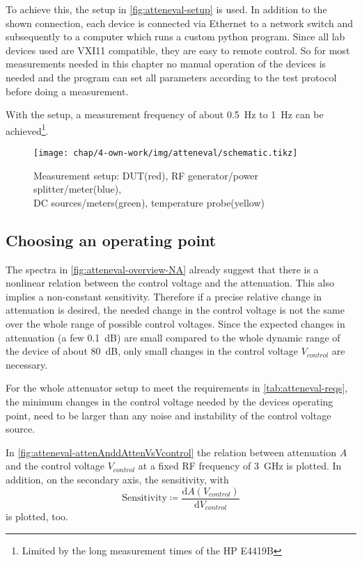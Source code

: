 To achieve this, the setup in \autoref{fig:atteneval-setup} is used. In addition to the shown connection, each device is connected via Ethernet to a network switch and subsequently to a computer which runs a custom python program. Since all lab devices used are VXI11 compatible, they are easy to remote control. So for most measurements needed in this chapter no manual operation of the devices is needed and the program can set all parameters according to the test protocol before doing a measurement.

With the setup, a measurement frequency of about \SI{0.5}{\Hz} to \SI{1}{\Hz} can be achieved\footnote{Limited by the long measurement times of the HP E4419B}.

\begin{figure}[tb]
	\centering
	\texttt{[image: chap/4-own-work/img/atteneval/schematic.tikz]}
	\caption{Measurement setup: DUT(red), RF generator/power splitter/meter(blue),\\ DC sources/meters(green), temperature probe(yellow)}
	\label{fig:atteneval-setup}
\end{figure}

\FloatBarrier
\subsection{Choosing an operating point}
The spectra in \autoref{fig:atteneval-overview-NA} already suggest that there is a nonlinear relation between the control voltage and the attenuation. This also implies a non-constant sensitivity. Therefore if a precise relative change in attenuation is desired, the needed change in the control voltage is not the same over the whole range of possible control voltages. Since the expected changes in attenuation (a few \SI{0.1}{\dB}) are small compared to the whole dynamic range of the device of about \SI{80}{\dB}, only small changes in the control voltage $V_{control}$ are necessary. 

For the whole attenuator setup to meet the requirements in \autoref{tab:atteneval-reqs}, the minimum changes in the control voltage needed by the devices operating point, need to be larger than any noise and instability of the control voltage source.

In \autoref{fig:atteneval-attenAnddAttenVsVcontrol} the relation between attenuation $A$ and the control voltage $V_{control}$ at a fixed RF frequency of \SI{3}{\GHz} is plotted. In addition, on the secondary axis, the sensitivity, with
\begin{equation}
\text{Sensitivity} \coloneq \frac{\text{d}A(V_{control})}{\text{d}V_{control}}
\end{equation}
is plotted, too.

